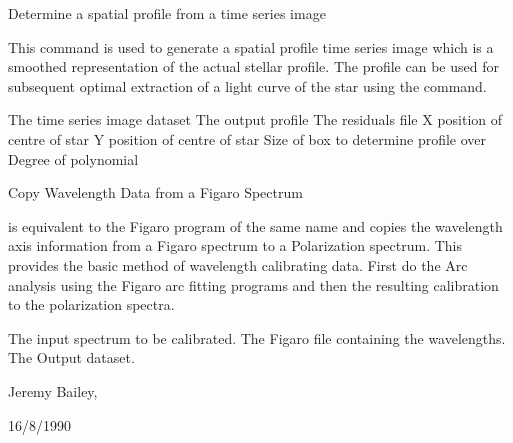 \begin{manroutinedescription}
        Determine a spatial profile from a time series image

        This command is used to generate a spatial profile time series
        image which is a smoothed representation of the actual stellar
        profile. The profile can be used for subsequent optimal extraction
        of a light curve of the star using the {} command.

\begin{manparametertable}
   The time %
series image dataset
   The %
output profile
   The %
residuals file
   X position of centre of star
   Y position of centre of star
   Size of box to determine %
profile over
   Degree of polynomial

\end{manparametertable}
\end{manroutinedescription}
\begin{manroutinedescription}
        Copy Wavelength Data from a Figaro Spectrum

        {} is equivalent to the Figaro program of the same name
        and copies the wavelength axis information from a Figaro
        spectrum to a {} Polarization spectrum. This provides the
        basic method of wavelength calibrating {} data. First do the
        Arc analysis using the Figaro arc fitting programs and then
        {} the resulting calibration to the {} %
polarization spectra.

\begin{manparametertable}
  The input %
spectrum to be calibrated.
     The Figaro file containing the %
wavelengths.
  The %
Output dataset.

\end{manparametertable}
         Jeremy Bailey, {}

         16/8/1990

\end{manroutinedescription}





